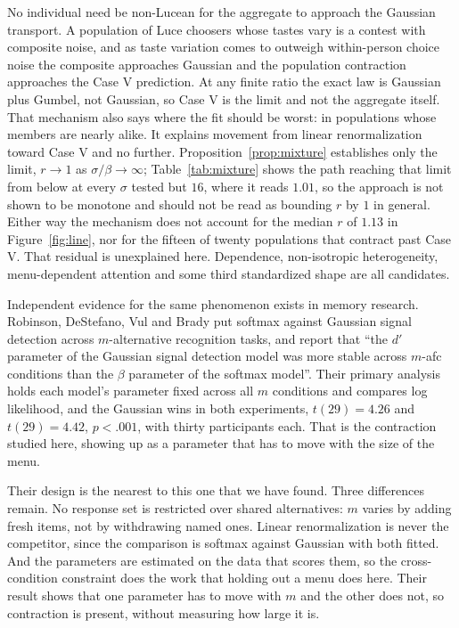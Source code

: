 \documentclass[11pt]{article}
\theoremstyle{italichead}
\begin{document}
No individual need be non-Lucean for the aggregate to approach the Gaussian transport. A
population of Luce choosers whose tastes vary is a contest with composite noise, and as taste
variation comes to outweigh within-person choice noise the composite approaches Gaussian and the
population contraction approaches the Case V prediction. At any finite ratio the exact law is
Gaussian plus Gumbel, not Gaussian, so Case V is the limit and not the aggregate itself.
That mechanism also says where the fit should be worst: in populations whose members are
nearly alike. It explains movement from linear renormalization toward Case V and no further.
Proposition~\ref{prop:mixture} establishes only the limit, $r \to 1$ as $\sigma/\beta \to
\infty$; Table~\ref{tab:mixture} shows the path reaching that limit from below at every
$\sigma$ tested but $16$, where it reads $1.01$, so the approach is not shown to be monotone and
should not be read as bounding $r$ by $1$ in general. Either way the mechanism does not account
for the median $r$ of $1.13$ in Figure~\ref{fig:line}, nor for the fifteen of twenty populations
that contract past Case V. That residual is unexplained here. Dependence, non-isotropic
heterogeneity, menu-dependent attention and some third standardized shape are all candidates.

Independent evidence for the same phenomenon exists in memory research. Robinson, DeStefano,
Vul and Brady \cite{robinson2023} put softmax against Gaussian signal detection across
$m$-alternative recognition tasks, and report that ``the $d'$ parameter of the Gaussian signal
detection model was more stable across $m$-afc conditions than the $\beta$ parameter of the
softmax model''. Their primary analysis holds each model's parameter fixed across all $m$
conditions and compares log likelihood, and the Gaussian wins in both experiments,
$t(29) = 4.26$ and $t(29) = 4.42$, $p < .001$, with thirty participants each. That is the
contraction studied here, showing up as a parameter that has to move with the size of the menu.

Their design is the nearest to this one that we have found. Three differences remain. No response
set is restricted over shared alternatives:
$m$ varies by adding fresh items, not by withdrawing named ones. Linear renormalization is
never the competitor, since the comparison is softmax against Gaussian with both fitted. And the
parameters are estimated on the data that scores them, so the cross-condition constraint does the
work that holding out a menu does here. Their result shows that one parameter has to move with
$m$ and the other does not, so contraction is present, without measuring how large it is.
\end{document}
